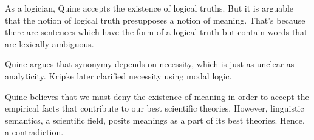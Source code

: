 \begin{objection}
As a logician, Quine accepts the existence of logical truths. But it is arguable that the notion of logical truth presupposes a notion of meaning. That's because there are sentences which have the form of a logical truth but contain words that are lexically ambiguous.
\end{objection}

\begin{objection}
Quine argues that synonymy depends on necessity, which is just as unclear as analyticity. Kripke later clarified necessity using modal logic.
\end{objection}

\begin{objection}
Quine believes that we must deny the existence of meaning in order to accept the empirical facts that contribute to our best scientific theories. However, linguistic semantics, a scientific field, posits meanings as a part of its best theories. Hence, a contradiction.
\end{objection}
